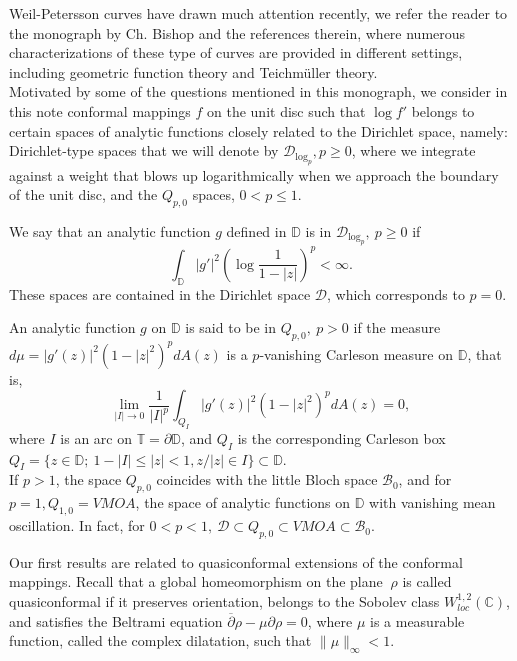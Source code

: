 \documentclass[12pt,a4paper]{article}
\theoremstyle{definition}
\theoremstyle{remark}
\newcommand{\D}{\mathbb{D}}
\newcommand{\T}{\mathbb{T}}
\numberwithin{komcounter}{section}
\begin{document}
	 Weil-Petersson curves have drawn much attention recently, we refer the reader to the monograph by Ch. Bishop \cite{b} and the references therein, where numerous  characterizations of these type of curves are provided in different settings, including geometric function theory and Teichm\"uller theory.\\
	 Motivated by some of the questions mentioned in this monograph, we consider in this note conformal mappings $f$ on the unit disc such that $\log f'$ belongs to certain spaces of analytic functions  closely related to the Dirichlet space, namely: Dirichlet-type spaces that we will denote by $\mathcal{D}_{\log_p}, p\geq 0$, where we integrate against a weight that blows up logarithmically when we approach the boundary of the unit disc, and the  $Q_{p,0} $ spaces, $0<p\leq 1$.
	 
	
	 We say that an analytic function $g$ defined in $\D$ is in $ \mathcal{D}_{\log_p}, ~p\geq 0$ if $$\int_\D |g'|^2 \left(\log \frac{1}{1-|z|}\right)^p<\infty.$$ These spaces are contained in the Dirichlet space $\mathcal{D}$, which corresponds to $p=0$.
	 
	 An analytic function $g$ on $\D$ is said to be in  $Q_{p,0},~p>0$ if the measure $d\mu=|g'(z)|^2 (1-|z|^2)^p dA(z)$ is a $p$-vanishing Carleson measure  on $\D$, that is,
	 $$
	 \lim_{|I|\to 0}\frac{1}{|I|^p}\int_{Q_I} |g'(z)|^2 (1-|z|^2)^p dA(z)= 0,
	 $$
	 where $I$ is an arc on $\T=\partial \D$, and $Q_I$ is the corresponding Carleson box $Q_I=\{z\in \D;~ 1-|I|\leq |z|<1, z/|z|\in I\}\subset \D $.\\
	 \indent
	 If $p > 1$, the space  $Q_{p,0}$ coincides with the little Bloch space $\mathcal{B}_0$, and for $p=1, Q_{1,0} = VMOA$, the space of analytic functions on $ \D$
	 with vanishing mean oscillation. In fact, for $0<p<1, ~ \mathcal{D} \subset Q_{p,0} \subset VMOA\subset \mathcal{B}_0 $.
	 
	 Our first results are related to  quasiconformal extensions of the conformal mappings. Recall that a global homeomorphism  on the plane $~\rho$ is called quasiconformal if it   preserves orientation, belongs to the Sobolev class $W^{1,2}_{loc}(\mathbb{C})$, and  satisfies the Beltrami equation
	 $\overline{\partial}\rho-\mu \partial\rho=0$, where $\mu$ is a measurable function, called the complex dilatation, such that $\|\mu\|_{\infty}<1$.
	 
\end{document}
